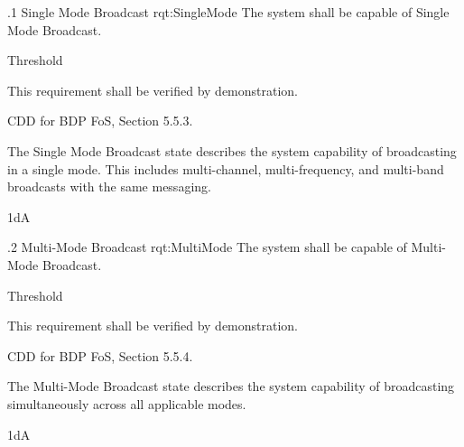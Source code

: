 
\ONERQMTVKPP
{\RqtNumberBase.1}
{Single Mode Broadcast}
{rqt:SingleMode}
{The system shall be capable of Single Mode Broadcast.}
{
	\item [Phase 1] Threshold
}
{This requirement shall be verified by demonstration.}
{
	\item [\cite{ref__BDP_FOS_CDD}] CDD for BDP FoS, Section 5.5.3.
}
{
	\item The Single Mode Broadcast state describes the system capability of broadcasting in a single mode. This includes multi-channel, multi-frequency, and multi-band broadcasts with the same messaging.
}
{1dA}


\ONERQMTVKPP
{\RqtNumberBase.2}
{Multi-Mode Broadcast}
{rqt:MultiMode}
{The system shall be capable of Multi-Mode Broadcast.}
{
	\item [Phase 1] Threshold
}
{This requirement shall be verified by demonstration.}
{
	\item [\cite{ref:BDP_FOS_CDD}] CDD for BDP FoS, Section 5.5.4.
}
{
	\item The Multi-Mode Broadcast state describes the system capability of broadcasting simultaneously across all applicable modes.
}
{1dA}

